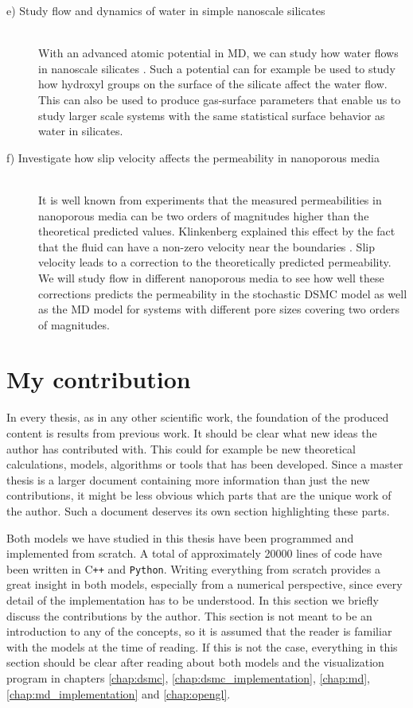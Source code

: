 \begin{description}
  \item[e) Study flow and dynamics of water in simple nanoscale silicates] \hfill \\
  With an advanced atomic potential in MD, we can study how water flows in nanoscale silicates \cite{vashishta1990interaction}. Such a potential can for example be used to study how hydroxyl groups on the surface of the silicate affect the water flow. This can also be used to produce gas-surface parameters that enable us to study larger scale systems with the same statistical surface behavior as water in silicates. 
  \item[f) Investigate how slip velocity affects the permeability in nanoporous media] \hfill \\
  It is well known from experiments that the measured permeabilities in nanoporous media can be two orders of magnitudes higher than the theoretical predicted values. Klinkenberg explained this effect by the fact that the fluid can have a non-zero velocity near the boundaries \cite{klinkenberg1941permeability}. Slip velocity leads to a correction to the theoretically predicted permeability. We will study flow in different nanoporous media to see how well these corrections predicts the permeability in the stochastic DSMC model as well as the MD model for systems with different pore sizes covering two orders of magnitudes.
\end{description}

\section{My contribution}
\label{sec:my_contributions}
In every thesis, as in any other scientific work, the foundation of the produced content is results from previous work. It should be clear what new ideas the author has contributed with. This could for example be new theoretical calculations, models, algorithms or tools that has been developed. Since a master thesis is a larger document containing more information than just the new contributions, it might be less obvious which parts that are the unique work of the author. Such a document deserves its own section highlighting these parts.

Both models we have studied in this thesis have been programmed and implemented from scratch. A total of approximately 20000 lines of code have been written in C{}\verb!++! and \verb!Python!. Writing everything from scratch provides a great insight in both models, especially from a numerical perspective, since every detail of the implementation has to be understood. In this section we briefly discuss the contributions by the author. This section is not meant to be an introduction to any of the concepts, so it is assumed that the reader is familiar with the models at the time of reading. If this is not the case, everything in this section should be clear after reading about both models and the visualization program in chapters \ref{chap:dsmc}, \ref{chap:dsmc_implementation}, \ref{chap:md}, \ref{chap:md_implementation} and \ref{chap:opengl}.
